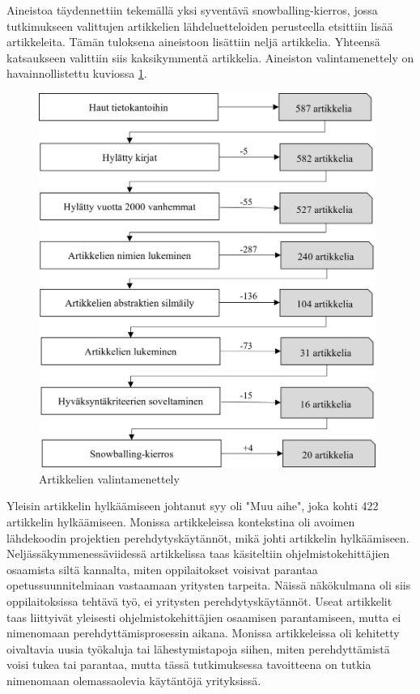 \documentclass[utf8]{gradu3}
\begin{document}
Aineistoa täydennettiin tekemällä yksi syventävä snowballing-kierros, jossa tutkimukseen valittujen artikkelien lähdeluetteloiden perusteella etsittiin lisää artikkeleita. Tämän tuloksena aineistoon lisättiin neljä artikkelia. Yhteensä katsaukseen valittiin siis kaksikymmentä artikkelia. Aineiston valintamenettely on havainnollistettu kuviossa \ref{kuvio:aineiston-rajaaminen-laaja}.

\begin{figure}[h]
    \centering
    \includegraphics[width=11cm]{media/aineiston-rajaaminen-laaja-vaakalinja.png}
    \caption{Artikkelien valintamenettely}
    \label{kuvio:aineiston-rajaaminen-laaja}
\end{figure}

Yleisin artikkelin hylkäämiseen johtanut syy oli "Muu aihe", joka kohti 422 artikkelin hylkäämiseen. Monissa artikkeleissa kontekstina oli avoimen lähdekoodin projektien perehdytyskäytännöt, mikä johti artikkelin hylkäämiseen. Neljässäkymmenessäviidessä artikkelissa taas käsiteltiin ohjelmistokehittäjien osaamista siltä kannalta, miten oppilaitokset voisivat parantaa opetussuunnitelmiaan vastaamaan yritysten tarpeita. Näissä näkökulmana oli siis oppilaitoksissa tehtävä työ, ei yritysten perehdytyskäytännöt. Useat artikkelit taas liittyivät yleisesti ohjelmistokehittäjien osaamisen parantamiseen, mutta ei nimenomaan perehdyttämisprosessin aikana. Monissa artikkeleissa oli kehitetty oivaltavia uusia työkaluja tai lähestymistapoja siihen, miten perehdyttämistä voisi tukea tai parantaa, mutta tässä tutkimuksessa tavoitteena on tutkia nimenomaan olemassaolevia käytäntöjä yrityksissä.
\end{document}
